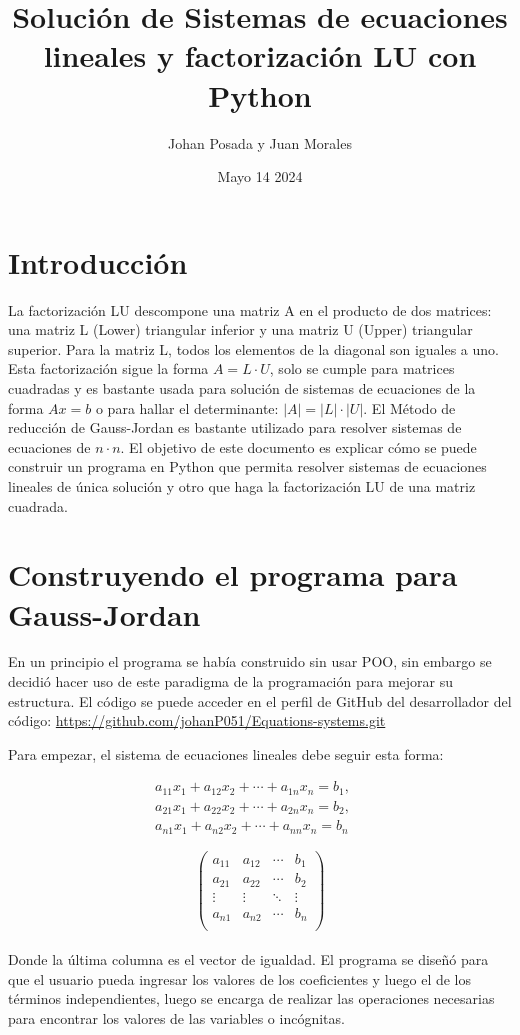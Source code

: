 \documentclass[letterpaper,12pt]{article}
\begin{document}
\title{Solución de Sistemas de ecuaciones lineales y factorización LU con Python}
\author{Johan Posada y Juan Morales}
\date{Mayo 14 2024}
\maketitle

\section{Introducción}
La factorización LU descompone una matriz A en el producto de dos matrices: una matriz L (Lower) triangular inferior y una matriz U (Upper) triangular superior. 
Para la matriz L, todos los elementos de la diagonal son iguales a uno.
Esta factorización sigue la forma $A = L\cdot U$, solo se cumple para matrices cuadradas y es bastante usada para 
solución de sistemas de ecuaciones de la forma $Ax = b$ o para hallar el determinante: $|A| = |L|\cdot|U|$. 
El Método de reducción de Gauss-Jordan es bastante utilizado para resolver sistemas de ecuaciones de $n\cdot n$. 
El objetivo de este documento es explicar cómo se puede construir un programa en Python que permita resolver
sistemas de ecuaciones lineales de única solución y otro que haga la factorización LU de una matriz cuadrada.
\section{Construyendo el programa para Gauss-Jordan}
En un principio el programa se había construido sin usar POO, sin embargo se decidió hacer uso de este paradigma de la programación para
mejorar su estructura. El código se puede acceder en el perfil de GitHub del desarrollador del código: \url{https://github.com/johanP051/Equations-systems.git}

Para empezar, el sistema de ecuaciones lineales debe seguir esta forma:

\begin{align*}
    a_{11}x_1 + a_{12}x_2 + \cdots + a_{1n}x_n = b_1, \quad
    \\
    a_{21}x_1 + a_{22}x_2 + \cdots + a_{2n}x_n = b_2, \quad
    \\
    a_{n1}x_1 + a_{n2}x_2 + \cdots + a_{nn}x_n = b_n
    \end{align*}


\[
\left(
\begin{array}{ccc|c}
a_{11} & a_{12} & \cdots & b_1 \\
a_{21} & a_{22} & \cdots & b_2 \\
\vdots & \vdots & \ddots & \vdots \\
a_{n1} & a_{n2} & \cdots & b_n \\
\end{array}
\right)
\]
\\
Donde la última columna es el vector de igualdad. El programa se diseñó para que el usuario pueda ingresar los valores de los coeficientes y luego el de los términos
independientes, luego se encarga de realizar las operaciones necesarias para encontrar los valores de las variables o incógnitas.
\end{document}
